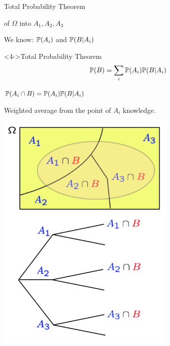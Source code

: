 \documentclass[fleqn,aspectratio=169]{beamer}
\begin{document}
\begin{frame}{Total Probability Theorem}

{
\plitemsep 0.1in
\bci 

\item<1->  of $\Omega$ into $A_1,A_2,A_3$

\item<2-> We know: $\mathbb{P}( A_i )$ and $\mathbb{P}( B | A_i )$ 

\item<3-> 


\begin{block}<4->{Total Probability Theorem}
$$
\mathbb{P}( B ) = \sum_{i} \mathbb{P}( A_i ) \mathbb{P}( B | A_i )
$$
\end{block}

\item<4-> $\mathbb{P}( A_i \cap B ) = \mathbb{P}( A_i ) \mathbb{P}( B | A_i )$

\item<5-> Weighted average from the point of $A_i$ knowledge. 
\eci 
}
{
\centering
\includegraphics[width=0.65\textwidth]{L2_total_ex.png}
}

\end{frame}
\end{document}
